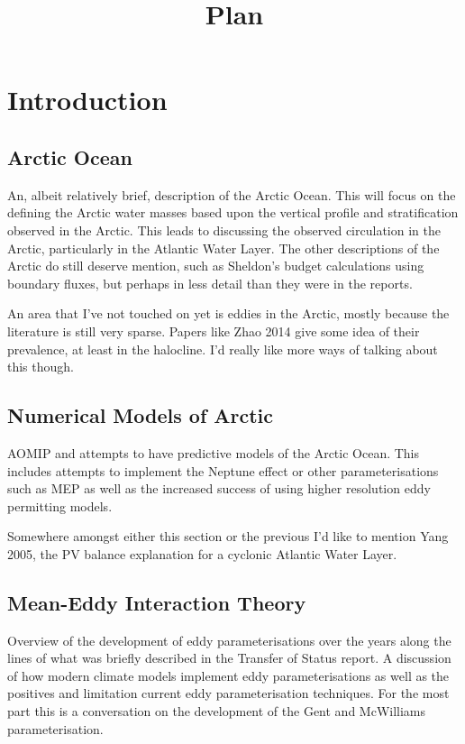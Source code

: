 \documentclass[10pt,a4paper]{article}
\title{Plan}
\begin{document}
\maketitle


\section{Introduction}

\subsection{Arctic Ocean}

An, albeit relatively brief, description of the Arctic Ocean. This will focus on 
the defining the Arctic water masses based upon the vertical profile and stratification
observed in the Arctic. This leads to discussing the observed circulation in the Arctic,
particularly in the Atlantic Water Layer. The other descriptions of the Arctic do still deserve
mention, such as Sheldon's budget calculations using boundary fluxes, but perhaps in less detail
than they were in the reports.

An area that I've not touched on yet is eddies in the Arctic, mostly because the literature
is still very sparse. Papers like Zhao 2014 give some idea of their prevalence, at least in the
halocline. I'd really like more ways of talking about this though.

\subsection{Numerical Models of Arctic}

AOMIP and attempts to have predictive models of the Arctic Ocean. This includes attempts
to implement the Neptune effect or other parameterisations such as MEP as well as
the increased success of using higher resolution eddy permitting models.

Somewhere amongst either this section or the previous I'd like to mention Yang 2005, the 
PV balance explanation for a cyclonic Atlantic Water Layer.

\subsection{Mean-Eddy Interaction Theory}

Overview of the development of eddy parameterisations over the years along
the lines of what was briefly described in the Transfer of Status report. 
A discussion of how
modern climate models implement eddy parameterisations
as well as the positives and limitation current 
eddy parameterisation techniques. 
For the most part this is a conversation on the development
of the Gent and McWilliams parameterisation.
\end{document}
